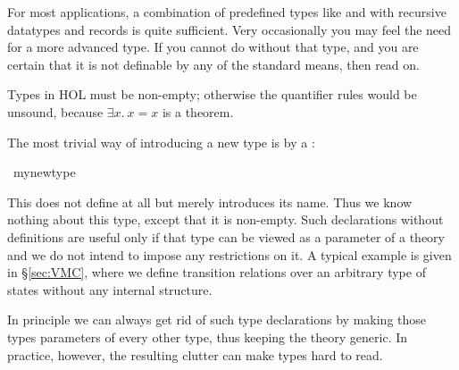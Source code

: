 %
\begin{isabellebody}%
\def\isabellecontext{Typedef}%
%
%
\begin{isamarkuptext}%
\label{sec:adv-typedef}
For most applications, a combination of predefined types like  and
\isa{{\isasymRightarrow}} with recursive datatypes and records is quite sufficient. Very
occasionally you may feel the need for a more advanced type. If you cannot do
without that type, and you are certain that it is not definable by any of the
standard means, then read on.
\begin{warn}
  Types in HOL must be non-empty; otherwise the quantifier rules would be
  unsound, because $\exists x.\ x=x$ is a theorem.
\end{warn}%
\end{isamarkuptext}%
%
%
\begin{isamarkuptext}%
\label{sec:typedecl}
The most trivial way of introducing a new type is by a :%
\end{isamarkuptext}%
\ my{\isacharunderscore}new{\isacharunderscore}type%
\begin{isamarkuptext}%
\noindent{}%
This does not define  at all but merely introduces its
name. Thus we know nothing about this type, except that it is
non-empty. Such declarations without definitions are
useful only if that type can be viewed as a parameter of a theory and we do
not intend to impose any restrictions on it. A typical example is given in
\S\ref{sec:VMC}, where we define transition relations over an arbitrary type
of states without any internal structure.

In principle we can always get rid of such type declarations by making those
types parameters of every other type, thus keeping the theory generic. In
practice, however, the resulting clutter can make types hard to read.


\end{isamarkuptext}
\end{isabellebody}
